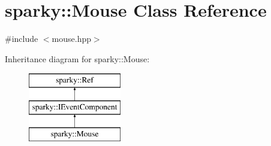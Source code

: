 \hypertarget{classsparky_1_1_mouse}{}\section{sparky\+:\+:Mouse Class Reference}
\label{classsparky_1_1_mouse}


{\ttfamily \#include $<$mouse.\+hpp$>$}

Inheritance diagram for sparky\+:\+:Mouse\+:\begin{figure}[H]
\begin{center}
\leavevmode
\includegraphics[height=3.000000cm]{classsparky_1_1_mouse}
\end{center}
\end{figure}
